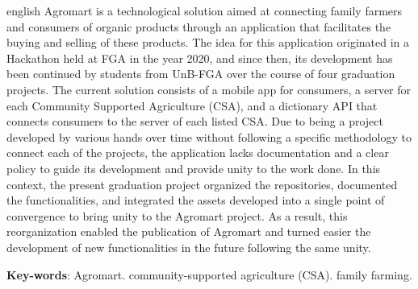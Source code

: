 \begin{resumo}[Abstract]
 \begin{otherlanguage*}{english}
   Agromart is a technological solution aimed at connecting family farmers and consumers of organic products through an application that facilitates the buying and selling of these products. The idea for this application originated in a Hackathon held at FGA in the year 2020, and since then, its development has been continued by students from UnB-FGA over the course of four graduation projects. The current solution consists of a mobile app for consumers, a server for each Community Supported Agriculture (CSA), and a dictionary API that connects consumers to the server of each listed CSA. Due to being a project developed by various hands over time without following a specific methodology to connect each of the projects, the application lacks documentation and a clear policy to guide its development and provide unity to the work done. In this context, the present graduation project organized the repositories, documented the functionalities, and integrated the assets developed into a single point of convergence to bring unity to the Agromart project. As a result, this reorganization enabled the publication of Agromart and turned easier the development of new functionalities in the future following the same unity.

   \vspace{\onelineskip}
 
   \noindent 
   \textbf{Key-words}: Agromart. community-supported agriculture (CSA). family farming.
 \end{otherlanguage*}
\end{resumo}
